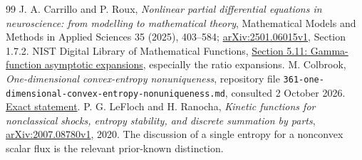 \documentclass[11pt,a4paper]{article}
\numberwithin{equation}{section}
\theoremstyle{remark}\newtheorem{remark}[theorem]{Remark}
\begin{document}
\begin{thebibliography}{99}
 J. A. Carrillo and P. Roux, \emph{Nonlinear partial differential equations in neuroscience: from modelling to mathematical theory}, Mathematical Models and Methods in Applied Sciences 35 (2025), 403--584; \href{https://arxiv.org/html/2501.06015v1}{arXiv:2501.06015v1}, Section 1.7.2.
 NIST Digital Library of Mathematical Functions, \href{https://dlmf.nist.gov/5.11}{Section 5.11: Gamma-function asymptotic expansions}, especially the ratio expansions.
 M. Colbrook, \emph{One-dimensional convex-entropy nonuniqueness}, repository file \texttt{361-one-dimensional-convex-entropy-nonuniqueness.md}, consulted 2 October 2026. \href{https://raw.githubusercontent.com/MColbrook/AIM/main/problems/361-one-dimensional-convex-entropy-nonuniqueness.md}{Exact statement}.
 P. G. LeFloch and H. Ranocha, \emph{Kinetic functions for nonclassical shocks, entropy stability, and discrete summation by parts}, \href{https://arxiv.org/html/2007.08780v1}{arXiv:2007.08780v1}, 2020. The discussion of a single entropy for a nonconvex scalar flux is the relevant prior-known distinction.
\end{thebibliography}
\end{document}
